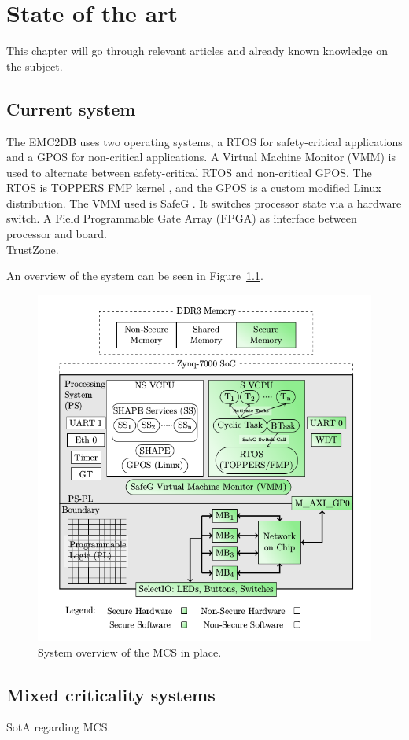 \chapter{State of the art}
This chapter will go through relevant articles and already known knowledge on the subject.

\section{Current system}
The EMC2DB uses two operating systems, a RTOS for safety-critical applications and a GPOS for non-critical applications. A Virtual Machine Monitor (VMM) is used to alternate between safety-critical RTOS and non-critical GPOS. The RTOS is TOPPERS FMP kernel \cite{website:FMP}, and the GPOS is a custom modified Linux distribution. The VMM used is SafeG \cite{website:safeg}. It switches processor state via a hardware switch. A Field Programmable Gate Array (FPGA) as interface between processor and board.\\ %

TrustZone.

An overview of the system can be seen in Figure~\ref{fig:introduction_overview}.

\begin{figure}[H]
\centering
\includegraphics[width=\textwidth]{./img/introduction_overview.png}
\caption{System overview of the MCS in place.\cite{zaki2016}}\label{fig:introduction_overview}
\end{figure}

\section{Mixed criticality systems}
SotA regarding MCS.
